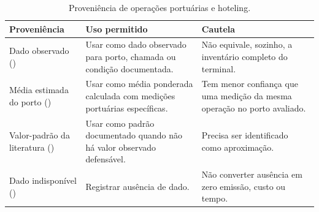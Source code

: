 \begin{table}[htbp]
\centering
\small
\caption{Proveniência de operações portuárias e hoteling.}
\label{tab:app-portops-proveniencia}
\begin{tabularx}{\textwidth}{L{0.25\textwidth}Y Y}
\toprule
Proveniência & Uso permitido & Cautela \\
\midrule
Dado observado () & Usar como dado observado para porto, chamada ou condição documentada. & Não equivale, sozinho, a inventário completo do terminal.\\
Média estimada do porto () & Usar como média ponderada calculada com medições portuárias específicas. & Tem menor confiança que uma medição da mesma operação no porto avaliado.\\
Valor-padrão da literatura () & Usar como padrão documentado quando não há valor observado defensável. & Precisa ser identificado como aproximação.\\
Dado indisponível () & Registrar ausência de dado. & Não converter ausência em zero emissão, custo ou tempo.\\
\bottomrule
\end{tabularx}
\end{table}
